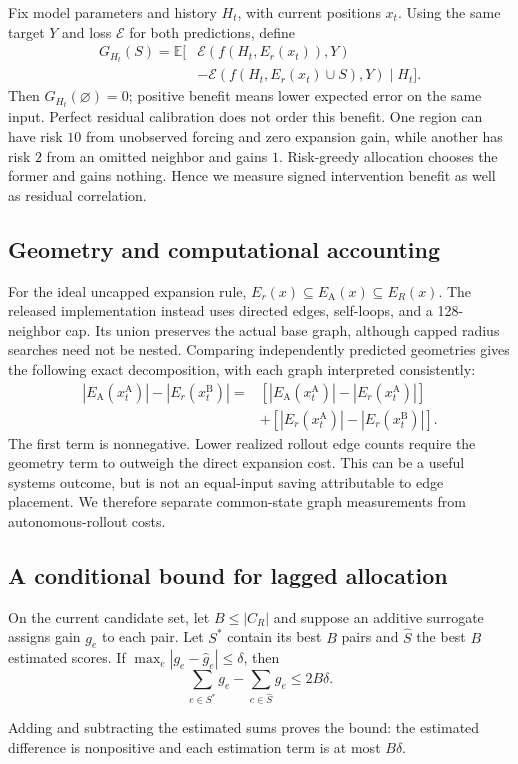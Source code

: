 Fix model parameters and history $H_t$, with current positions $x_t$. Using the same target $Y$ and loss $\mathcal E$ for both predictions, define
\begin{align}
 G_{H_t}(S)=\mathbb E[&\mathcal E(f(H_t,E_r(x_t)),Y)\nonumber\\
              &-\mathcal E(f(H_t,E_r(x_t)\cup S),Y)\mid H_t].
\end{align}
Then $G_{H_t}(\varnothing)=0$; positive benefit means lower expected error on the same input. Perfect residual calibration does not order this benefit. One region can have risk $10$ from unobserved forcing and zero expansion gain, while another has risk $2$ from an omitted neighbor and gains $1$. Risk-greedy allocation chooses the former and gains nothing. Hence we measure signed intervention benefit as well as residual correlation.

\subsection{Geometry and computational accounting}
For the ideal uncapped expansion rule, $E_r(x)\subseteq E_{\mathrm A}(x)\subseteq E_R(x)$. The released implementation instead uses directed edges, self-loops, and a 128-neighbor cap. Its union preserves the actual base graph, although capped radius searches need not be nested. Comparing independently predicted geometries gives the following exact decomposition, with each graph interpreted consistently:
\begin{align}
 |E_{\mathrm A}(x_t^{\mathrm A})|-|E_r(x_t^{\mathrm B})|
 ={}&[|E_{\mathrm A}(x_t^{\mathrm A})|-|E_r(x_t^{\mathrm A})|]\nonumber\\
 &+[|E_r(x_t^{\mathrm A})|-|E_r(x_t^{\mathrm B})|].
 \label{eq:decomposition}
\end{align}
The first term is nonnegative. Lower realized rollout edge counts require the geometry term to outweigh the direct expansion cost. This can be a useful systems outcome, but is not an equal-input saving attributable to edge placement. We therefore separate common-state graph measurements from autonomous-rollout costs.

\subsection{A conditional bound for lagged allocation}
\begin{proposition}
On the current candidate set, let $B\le |C_R|$ and suppose an additive surrogate assigns gain $g_e$ to each pair. Let $S^*$ contain its best $B$ pairs and $\widehat S$ the best $B$ estimated scores. If $\max_e|g_e-\widehat g_e|\le\delta$, then
\begin{equation}
 \sum_{e\in S^*}g_e-\sum_{e\in\widehat S}g_e\le2B\delta.
 \label{eq:regret}
\end{equation}
\end{proposition}
Adding and subtracting the estimated sums proves the bound: the estimated difference is nonpositive and each estimation term is at most $B\delta$.

